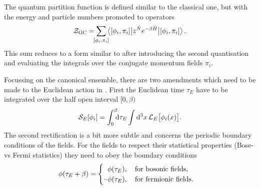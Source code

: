 The quantum partition function is defined similar to the classical one, but with
the energy and particle numbers promoted to operators
%
\begin{equation}
  \mathcal{Z}_{\text{GC}} = \sum_{\mathclap{[\phi_i, \pi_i]}}
  \big\langle [\phi_i, \pi_i] \big|
    z^{\hat{N}} e^{-\beta \hat{H}} \big| [\phi_i, \pi_i] \big\rangle \,.
\end{equation}
%
This sum reduces to a form similar to  after introducing
the second quantisation and evaluating the integrals over the conjugate momentum
fields $\pi_i$.


Focussing on the canonical ensemble, there are two amendments which need to be
made to the Euclidean action in . First the Euclidean time
$\tau_E$ have to be integrated over the half open interval $[0, \beta)$
%
\begin{equation}
  \mathcal{S}_E[\phi_i] = \int_{\mathrlap{0}}^{\mathrlap{\beta}} \mathrm{d} \tau_E \int \mathrm{d}^3 x \,
    \mathcal{L}_E\big[\phi_i(x)\big].
\end{equation}
%
The second rectification is a bit more subtle and concerns the periodic boundary
conditions of the fields. For the fields to respect their statistical properties
(Bose- vs Fermi statistics) they need to obey the boundary conditions
%
\begin{equation} \label{eq-boundary-conditions}
  \phi(\tau_E + \beta) = \begin{cases}
    \hphantom{\minus}\phi(\tau_E), \hskip1em \text{for bosonic fields}, \\
    \minus\phi(\tau_E), \hskip1em \text{for fermionic fields}.
  \end{cases}
\end{equation}

